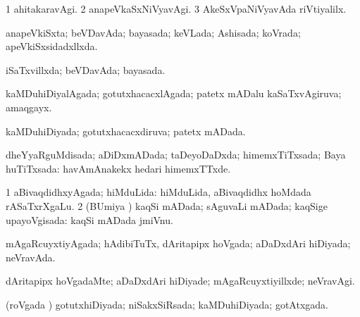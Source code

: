 {\bentry
{} 
\gl{\nA}
\expl{}
\bmng
\emng
\eentry

\bentry
{} 
\gl{\kirxvi}
\expl{}
\bmng
\bnum
\num{1} ahitakaravAgi. 
\num{2} anapeVkaSxNiVyavAgi. 
\num{3} AkeSxVpaNiVyavAda riVtiyalilx. 
\enum
\emng
\eentry

\bentry
{} 
\gl{\gu}
\expl{}
\bmng
 anapeVkiSxta; beVDavAda; bayasada; keVLada; Ashisada; koVrada; apeVkiSxsidadxllxda. 
\emng
\eentry

\bentry
{} 
\gl{\gu}
\expl{}
\bmng
 iSaTxvillxda; beVDavAda; bayasada. 
\emng
\eentry

\bentry
{} 
\gl{\gu}
\expl{}
\bmng
 kaMDuhiDiyalAgada; gotutxhacacxlAgada; patetx mADalu kaSaTxvAgiruva; amaqgayx. 
\emng
\eentry

\bentry
{} 
\gl{\gu}
\expl{}
\bmng
 kaMDuhiDiyada; gotutxhacacxdiruva; patetx mADada. 
\emng
\eentry

\bentry
{} 
\gl{\gu}
\expl{}
\bmng
\emng
\eentry

\bentry
{} 
\gl{\gu}
\expl{}
\bmng
 dheYyaRguMdisada; aDiDxmADada; taDeyoDaDxda; himemxTiTxsada; Baya huTiTxsada:  havAmAnakekx hedari himemxTTxde. 
\emng
\eentry

\bentry
{} 
\gl{\gu}
\expl{}
\bmng
\bnum
\num{1} aBivaqdidhxyAgada; hiMduLida:  hiMduLida, aBivaqdidhx hoMdada rASaTxrXgaLu. 
\num{2} (BUmiya \vi) kaqSi mADada; sAguvaLi mADada; kaqSige upayoVgisada:  kaqSi mADada jmiVnu. 
\enum
\emng
\eentry

\bentry
{} 
\gl{\gu}
\expl{}
\bmng
 mAgaRcuyxtiyAgada; hAdibiTuTx, dAritapipx hoVgada; aDaDxdAri hiDiyada; neVravAda. 
\emng
\eentry

\bentry
{} 
\gl{\kirxvi}
\expl{}
\bmng
 dAritapipx hoVgadaMte; aDaDxdAri hiDiyade; mAgaRcuyxtiyillxde; neVravAgi. 
\emng
\eentry

\bentry
{} 
\gl{\gu}
\expl{}
\bmng
(roVgada \vi) gotutxhiDiyada; niSakxSiRsada; kaMDuhiDiyada; gotAtxgada. 
\emng
\eentry

}
